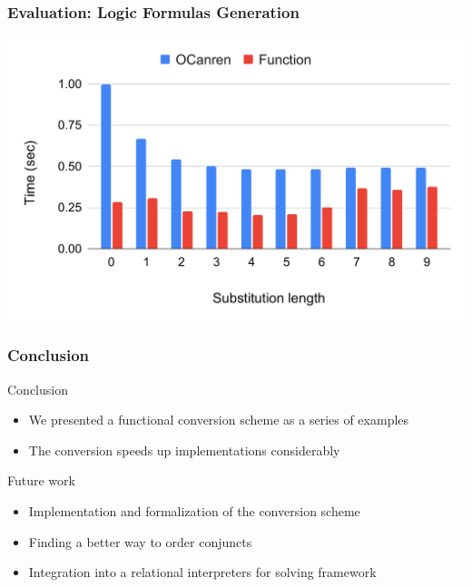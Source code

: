 \documentclass[xcolor=table]{beamer}
\newcommand{\mk}{\textsc{miniKanren}\xspace}
\begin{document}
\begin{frame}[fragile]
  \frametitle{Evaluation: Logic Formulas Generation}
  \includegraphics[width=\textwidth]{fig/eval/prop.pdf}
\end{frame}

\begin{frame}[fragile]
  \frametitle{Conclusion}
Conclusion
  \begin{itemize}
    \item We presented a functional conversion scheme as a series of examples
    \item The conversion speeds up implementations considerably
  \end{itemize}

\vfill

Future work
  \begin{itemize}
    \item Implementation and formalization of the conversion scheme
    \item Finding a better way to order conjuncts
    \item Integration into a relational interpreters for solving framework
  \end{itemize}
\end{frame}





% 

%     
\end{document}
